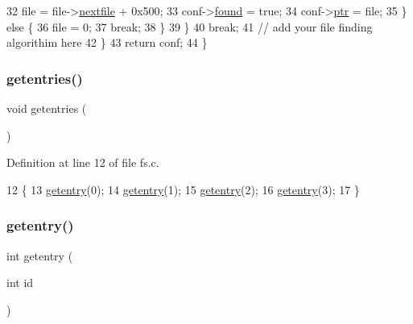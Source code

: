 \begin{DoxyCode}
32                     file = file->\hyperlink{a00340_aa2c7e2e1b3827ce9fbaa045b89202784_aa2c7e2e1b3827ce9fbaa045b89202784}{nextfile} + 0x500;
33                     conf->\hyperlink{a00324_aadd5ca2c6b0ddfb40e058f420907fd7d_aadd5ca2c6b0ddfb40e058f420907fd7d}{found} = \textcolor{keyword}{true};
34                     conf->\hyperlink{a00324_ad00ee8a5532f1cb73a4cc2faa80afac8_ad00ee8a5532f1cb73a4cc2faa80afac8}{ptr} = file;
35                 \} \textcolor{keywordflow}{else} \{
36                     file = 0;
37                     \textcolor{keywordflow}{break};
38                 \}
39             \}
40             \textcolor{keywordflow}{break};
41         \textcolor{comment}{// add your file finding algorithim here}
42     \}
43     \textcolor{keywordflow}{return} conf;
44 \}
\end{DoxyCode}
\mbox{\label{a00149_a414110036132977c34813673360e1a63_a414110036132977c34813673360e1a63}} 
\subsubsection{\texorpdfstring{getentries()}{getentries()}}
{\footnotesize\ttfamily void getentries (\begin{DoxyParamCaption}{ }\end{DoxyParamCaption})}



Definition at line 12 of file fs.\+c.


\begin{DoxyCode}
12                   \{
13     \hyperlink{a00149_a3fb32d07d3bd05144a196c94fc59c0d1_a3fb32d07d3bd05144a196c94fc59c0d1}{getentry}(0);
14     \hyperlink{a00149_a3fb32d07d3bd05144a196c94fc59c0d1_a3fb32d07d3bd05144a196c94fc59c0d1}{getentry}(1);
15     \hyperlink{a00149_a3fb32d07d3bd05144a196c94fc59c0d1_a3fb32d07d3bd05144a196c94fc59c0d1}{getentry}(2);
16     \hyperlink{a00149_a3fb32d07d3bd05144a196c94fc59c0d1_a3fb32d07d3bd05144a196c94fc59c0d1}{getentry}(3);
17 \}
\end{DoxyCode}
\mbox{\label{a00149_a3fb32d07d3bd05144a196c94fc59c0d1_a3fb32d07d3bd05144a196c94fc59c0d1}} 
\subsubsection{\texorpdfstring{getentry()}{getentry()}}
{\footnotesize\ttfamily int getentry (\begin{DoxyParamCaption}\item[{int}]{id }\end{DoxyParamCaption})}



